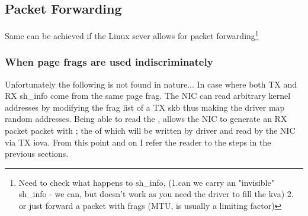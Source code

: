 \subsection{Packet Forwarding}
Same can be achieved if the Linux sever allows for packet forwarding\footnote{Need to check what happens to sh\_info, (1.can we carry an "invisible" sh\_info - we can, but doesn't work as you need the driver to fill the kva) 2. or just forward a packet with frags (MTU, is usually a limiting factor)}

\subsubsection{When page frags are used indiscriminately}
Unfortunately the following is not found in nature...\newline
In case where both TX and RX sh\_info come from the same page frag. The NIC can read arbitrary kernel addresses by modifying the frag list of a TX skb thus making the driver map random addresses.
Being able to read the \shinfo, allows the NIC to generate an RX packet packet with \mabaf; the \kva of which will be written by driver and read by the NIC via TX iova. From this point and on I refer the reader to the steps in the previous sections.